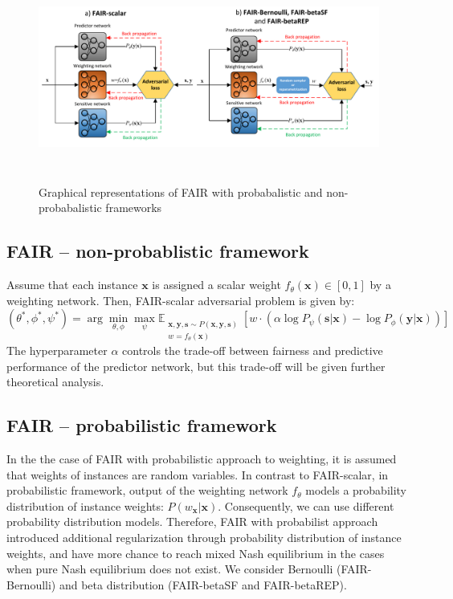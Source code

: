 \documentclass[preprint,12pt]{elsarticle}
\begin{document}
\begin{figure}[t!]
	\vskip 0.2in
	\center
	\includegraphics[angle=0, width=1\textwidth, height = 2.7in]{Fig1.pdf}
	\captionsetup{justification=centering}
	\caption{Graphical representations of FAIR with probabalistic and non-probabalistic frameworks}
	\label{fig:Fig1}
	\vskip -0.2in
\end{figure}

\subsection{FAIR -- non-probablistic framework}
Assume that each instance $\mathbf{x}$ is assigned a scalar weight $f_\theta(\mathbf{x})\in[0,1]$ by a weighting network. Then, FAIR-scalar adversarial problem is given by:
\begin{equation}
\label{Eq:Loss-scalar}
(\theta^*,\phi^*,\psi^*) = \arg\min_{\theta,\phi}\max_{\psi}\mathbb{E}_{\substack{\mathbf{x},\mathbf{y},\mathbf{s} \sim P(\mathbf{x},\mathbf{y},\mathbf{s})\\w=f_\theta(\mathbf{x})}} [w \cdot(\alpha\log P_{\psi}(\mathbf{s}|\mathbf{x})
- \log P_{\phi}(\mathbf{y}|\mathbf{x}))]
\end{equation}
The hyperparameter $\alpha$ controls the trade-off between fairness and predictive performance of the predictor network, but this trade-off will be given further theoretical analysis.


\subsection{FAIR -- probabilistic framework}

In the the case of FAIR with probabilistic approach to weighting, it is assumed that  weights of instances are random variables. 
In contrast to FAIR-scalar, in probabilistic framework, output of the weighting network $f_\theta$ models a probability distribution of instance weights: $P(w_\mathbf{x}|\mathbf{x})$. Consequently, we can use different probability distribution models. Therefore, FAIR with probabilist approach introduced additional regularization through probability distribution of instance weights, and have more chance to reach mixed Nash equilibrium in the cases when pure Nash equilibrium does not exist.  We consider Bernoulli (FAIR-Bernoulli) and beta distribution (FAIR-betaSF and FAIR-betaREP). 
\end{document}

